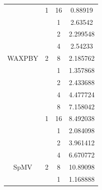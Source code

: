 \begin{table}[]
\begin{tabular}{cccc}
                         & \multirow{-5}{*}{\cellcolor[HTML]{EFEFEF}1} & 16                         & 0.88919                           \\ \cline{3-4} 
                         &                                             & \cellcolor[HTML]{EFEFEF}1  & \cellcolor[HTML]{EFEFEF}2.63542   \\
                         &                                             & 2                          & 2.299548                          \\
                         &                                             & \cellcolor[HTML]{EFEFEF}4  & \cellcolor[HTML]{EFEFEF}2.54233   \\
\multirow{-9}{*}{WAXPBY} & \multirow{-4}{*}{2}                         & 8                          & 2.185762                          \\ \hline
                         & \cellcolor[HTML]{EFEFEF}                    & \cellcolor[HTML]{EFEFEF}1  & \cellcolor[HTML]{EFEFEF}1.357868  \\
                         & \cellcolor[HTML]{EFEFEF}                    & 2                          & 2.433688                          \\
                         & \cellcolor[HTML]{EFEFEF}                    & \cellcolor[HTML]{EFEFEF}4  & \cellcolor[HTML]{EFEFEF}4.477724  \\
                         & \cellcolor[HTML]{EFEFEF}                    & 8                          & 7.158042                          \\
                         & \multirow{-5}{*}{\cellcolor[HTML]{EFEFEF}1} & \cellcolor[HTML]{EFEFEF}16 & \cellcolor[HTML]{EFEFEF}8.492038  \\ \cline{3-4} 
                         &                                             & 1                          & 2.084098                          \\
                         &                                             & \cellcolor[HTML]{EFEFEF}2  & \cellcolor[HTML]{EFEFEF}3.961412  \\
                         &                                             & 4                          & 6.670772                          \\
\multirow{-9}{*}{SpMV}   & \multirow{-4}{*}{2}                         & \cellcolor[HTML]{EFEFEF}8  & \cellcolor[HTML]{EFEFEF}10.89098  \\ \hline
                         & \cellcolor[HTML]{EFEFEF}                    & 1                          & 1.168888                          \\

\end{tabular}
\end{table}
